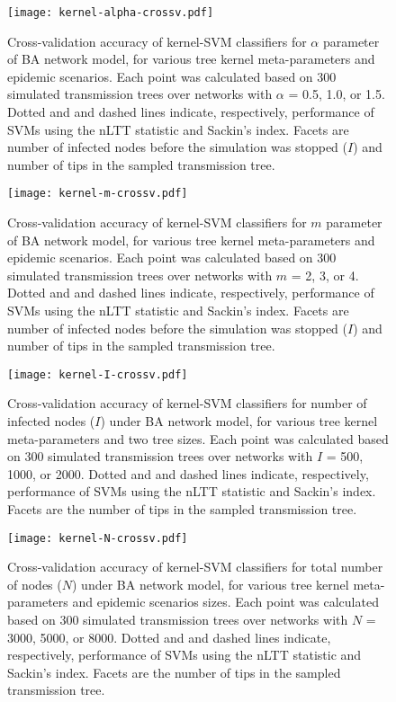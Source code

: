 \documentclass[12pt]{article}\usepackage[]{graphicx}\usepackage[]{color}
\begin{document}
\begin{figure}[ht]
  \centering
  \texttt{[image: kernel-alpha-crossv.pdf]}
  \caption{
    Cross-validation accuracy of kernel-SVM classifiers for $\alpha$ parameter
    of BA network model, for various tree kernel meta-parameters and
    epidemic scenarios. Each point was calculated based on 300 simulated
    transmission trees over networks with $\alpha$ = 0.5, 1.0, or 1.5. Dotted
    and and dashed lines indicate, respectively, performance of SVMs using the
    nLTT statistic and Sackin's index. Facets are number of infected nodes
    before the simulation was stopped ($I$) and number of tips in the sampled
    transmission tree.
  }
  \label{fig:alphacrossv}
\end{figure}

\begin{figure}[ht]
  \centering
  \texttt{[image: kernel-m-crossv.pdf]}
  \caption{Cross-validation accuracy of kernel-SVM classifiers for $m$
      parameter of BA network model, for various tree kernel
      meta-parameters and epidemic scenarios. Each point was calculated based
      on 300 simulated transmission trees over networks with $m$ = 2, 3, or 4.
      Dotted and and dashed lines indicate, respectively, performance of SVMs
      using the nLTT statistic and Sackin's index. Facets are number of
      infected nodes before the simulation was stopped ($I$) and number of tips
      in the sampled transmission tree.
  }
  \label{fig:mcrossv}
\end{figure}

\begin{figure}[ht]
  \centering
  \texttt{[image: kernel-I-crossv.pdf]}
  \caption{Cross-validation accuracy of kernel-SVM classifiers for number of
      infected nodes ($I$) under BA network model, for various tree
      kernel meta-parameters and two tree sizes. Each point was calculated
      based on 300 simulated transmission trees over networks with $I$ = 500,
      1000, or 2000. Dotted and and dashed lines indicate, respectively,
      performance of SVMs using the nLTT statistic and Sackin's index. Facets
      are the number of tips in the sampled transmission tree.
  }
  \label{fig:Icrossv}
\end{figure}

\begin{figure}[ht]
  \centering
  \texttt{[image: kernel-N-crossv.pdf]}
  \caption{Cross-validation accuracy of kernel-SVM classifiers for total number
      of nodes ($N$) under BA network model, for various tree kernel
      meta-parameters and epidemic scenarios sizes. Each point was calculated
      based on 300 simulated transmission trees over networks with $N$ = 3000,
      5000, or 8000. Dotted and and dashed lines indicate, respectively,
      performance of SVMs using the nLTT statistic and Sackin's index. Facets
      are the number of tips in the sampled transmission tree.
  }
  \label{fig:Ncrossv}
\end{figure}
\end{document}
